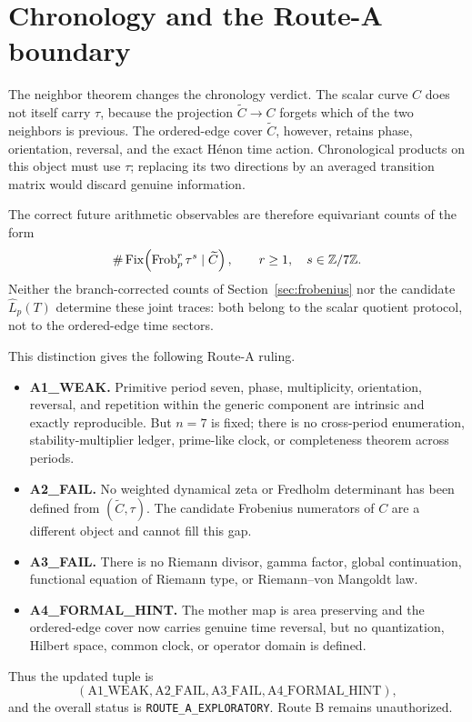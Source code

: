 \section{Chronology and the Route-A boundary}

The neighbor theorem changes the chronology verdict.  The scalar curve $C$
does not itself carry $\tau$, because the projection
$\widetilde C\to C$ forgets which of the two neighbors is previous.  The
ordered-edge cover $\widetilde C$, however, retains phase, orientation,
reversal, and the exact H\'enon time action.  Chronological products on this
object must use $\tau$; replacing its two directions by an averaged
transition matrix would discard genuine information.

The correct future arithmetic observables are therefore equivariant counts
of the form
\[
 \#\operatorname{Fix}\!\left(\operatorname{Frob}_p^r\tau^s
       \mid\widetilde C\right),
 \qquad r\ge1,\quad s\in\mathbb Z/7\mathbb Z.
\]
Neither the branch-corrected counts of Section~\ref{sec:frobenius} nor the candidate
$\widehat L_p(T)$ determine these joint traces: both belong to the scalar
quotient protocol, not to the ordered-edge time sectors.

This distinction gives the following Route-A ruling.

\begin{itemize}
 \item \textbf{A1\_WEAK.}  Primitive period seven, phase, multiplicity,
 orientation, reversal, and repetition within the generic component are
 intrinsic and exactly reproducible.  But $n=7$ is fixed; there is no
 cross-period enumeration, stability-multiplier ledger, prime-like clock, or
 completeness theorem across periods.
 \item \textbf{A2\_FAIL.}  No weighted dynamical zeta or Fredholm determinant
 has been defined from $(\widetilde C,\tau)$.  The candidate Frobenius
 numerators of $C$ are a different object and cannot fill this gap.
 \item \textbf{A3\_FAIL.}  There is no Riemann divisor, gamma factor, global
 continuation, functional equation of Riemann type, or
 Riemann--von Mangoldt law.
 \item \textbf{A4\_FORMAL\_HINT.}  The mother map is area preserving and the
 ordered-edge cover now carries genuine time reversal, but no quantization,
 Hilbert space, common clock, or operator domain is defined.
\end{itemize}

Thus the updated tuple is
\[
 (\mathrm{A1\_WEAK},\mathrm{A2\_FAIL},
   \mathrm{A3\_FAIL},\mathrm{A4\_FORMAL\_HINT}),
\]
and the overall status is \texttt{ROUTE\_A\_EXPLORATORY}.  Route B remains
unauthorized.
